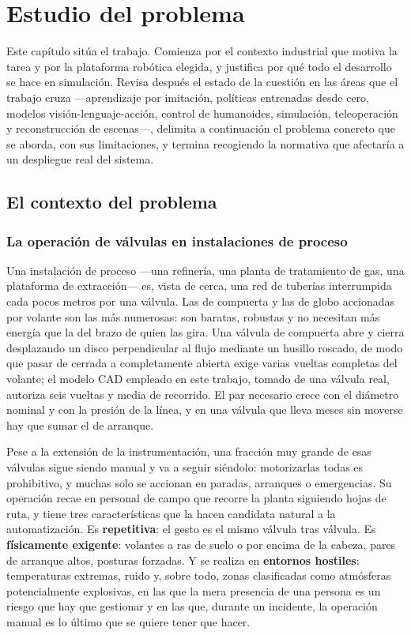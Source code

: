 \chapter{Estudio del problema}
\label{Estudio del problema}

Este capítulo sitúa el trabajo. Comienza por el contexto industrial que motiva la tarea y por la
plataforma robótica elegida, y justifica por qué todo el desarrollo se hace en simulación. Revisa
después el estado de la cuestión en las áreas que el trabajo cruza —aprendizaje por imitación,
políticas entrenadas desde cero, modelos visión-lenguaje-acción, control de humanoides, simulación,
teleoperación y reconstrucción de escenas—, delimita a continuación el problema concreto que se
aborda, con sus limitaciones, y termina recogiendo la normativa que afectaría a un despliegue real
del sistema.


\section{El contexto del problema}

\subsection{La operación de válvulas en instalaciones de proceso}

Una instalación de proceso —una refinería, una planta de tratamiento de gas, una plataforma de
extracción— es, vista de cerca, una red de tuberías interrumpida cada pocos metros por una válvula.
Las de compuerta y las de globo accionadas por volante son las más numerosas: son baratas, robustas
y no necesitan más energía que la del brazo de quien las gira. Una válvula de compuerta abre y cierra
desplazando un disco perpendicular al flujo mediante un husillo roscado, de modo que pasar de cerrada
a completamente abierta exige varias vueltas completas del volante; el modelo CAD empleado en este
trabajo, tomado de una válvula real, autoriza seis vueltas y media de recorrido. El par necesario
crece con el diámetro nominal y con la presión de la línea, y en una válvula que lleva meses sin
moverse hay que sumar el de arranque.

Pese a la extensión de la instrumentación, una fracción muy grande de esas válvulas sigue siendo
manual y va a seguir siéndolo: motorizarlas todas es prohibitivo, y muchas solo se accionan en
paradas, arranques o emergencias. Su operación recae en personal de campo que recorre la planta
siguiendo hojas de ruta, y tiene tres características que la hacen candidata natural a la
automatización. Es \textbf{repetitiva}: el gesto es el mismo válvula tras válvula. Es
\textbf{físicamente exigente}: volantes a ras de suelo o por encima de la cabeza, pares de arranque
altos, posturas forzadas. Y se realiza en \textbf{entornos hostiles}: temperaturas extremas, ruido y,
sobre todo, zonas clasificadas como atmósferas potencialmente explosivas, en las que la mera
presencia de una persona es un riesgo que hay que gestionar y en las que, durante un incidente, la
operación manual es lo último que se quiere tener que hacer.

